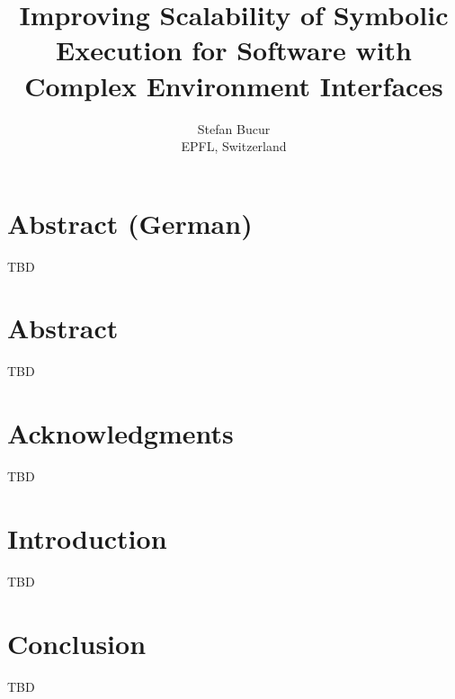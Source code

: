 \documentclass[letterpaper,12pt]{book}
\newcommand{\thesistitle}{Improving Scalability of Symbolic Execution for Software with Complex Environment Interfaces}
\begin{document}
\date{}
\title{\thesistitle}
\author{Stefan Bucur \\ EPFL, Switzerland}

\maketitle

\chapter*{Abstract (German)}

TBD

\chapter*{Abstract}

TBD

\chapter*{Acknowledgments}

TBD

\tableofcontents
\listoffigures
\listoftables

\chapter{Introduction}

TBD

\chapter{Conclusion}

TBD



\end{document}
